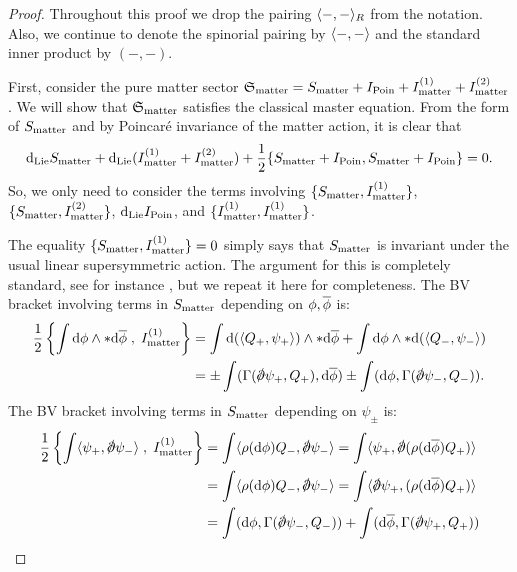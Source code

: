 \documentclass[10pt, oneside]{article}
\begin{document}
\begin{proof}
Throughout this proof we drop the pairing $\<-,-\>_R$ from the notation.
Also, we continue to denote the spinorial pairing by $\<-,-\>$ and the standard inner product by $(-,-)$. 

First, consider the pure matter sector $\fS_{\rm matter} = S_{\rm matter} + I_{\rm Poin} + I^{(1)}_{\rm matter} + I^{(2)}_{\rm matter}$. 
We will show that $\fS_{\rm matter}$ satisfies the classical master equation. 
From the form of $S_{\rm matter}$ and by Poincar\'{e} invariance of the matter action, it is clear that
\[
\d_{\rm Lie} S_{\rm matter} + \d_{\rm Lie} (I^{(1)}_{\rm matter} + I^{(2)}_{\rm matter}) + \frac{1}{2} \{S_{\rm matter} + I_{\rm Poin}, S_{\rm matter} + I_{\rm Poin}\} = 0 .
\]
So, we only need to consider the terms involving $\{S_{\rm matter}, I_{\rm matter}^{(1)}\}$, $\{S_{\rm matter}, I^{(2)}_{\rm matter}\}$, $\d_{\rm Lie} I_{\rm Poin}$, and $\{I^{(1)}_{\rm matter}, I^{(1)}_{\rm matter}\}$. 

The equality $\{S_{\rm matter}, I_{\rm matter}^{(1)}\} = 0$ simply says that $S_{\rm matter}$ is invariant under the usual linear supersymmetric action.
The argument for this is completely standard, see for instance , but we repeat it here for completeness. 
The BV bracket involving terms in $S_{\rm matter}$ depending on $\phi,\Bar{\phi}$ is:
\begin{align*}
\frac{1}{2} \left\{ \int \d \phi \wedge * \d \Bar{\phi} \; , \; I_{\rm matter}^{(1)} \right\} & = \int \d (\<Q_+, \psi_+\>) \wedge * \d \Bar{\phi} + \int \d \phi \wedge * \d (\<Q_-, \psi_-\>) \\
& = \pm \int (\Gamma(\sd \dd \psi_+, Q_+), \d \Bar{\phi}) \pm \int (\d \phi, \Gamma(\sd \dd \psi_-, Q_-)) .
\end{align*}
The BV bracket involving terms in $S_{\rm matter}$ depending on $\psi_\pm$ is:
\begin{align*}
\frac{1}{2} \left\{\int \<\psi_+ , \sd \dd \psi_-\> \; , \; I_{\rm matter}^{(1)} \right\} & = \int \<\rho(\d \phi) Q_-, \sd \dd \psi_-\> = \int \<\psi_+, \sd \dd (\rho(\d \Bar{\phi}) Q_+)\> \\ & =  \int \<\rho(\d \phi) Q_-, \sd \dd \psi_-\> = \int \<\sd \dd \psi_+, (\rho(\d \Bar{\phi}) Q_+)\> \\ & = \int (\d \phi, \Gamma(\sd \dd \psi_-, Q_-)) + \int (\d \Bar{\phi}, \Gamma(\sd \dd \psi_+, Q_+)) 
\end{align*}


\end{proof}
\end{document}

